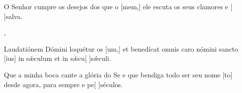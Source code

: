 {    {\item {}O Senhor cumpre os desejos dos que o [mem,] ele escuta os seus clamores e [ ]{sal}va.~\Responsorium},
  {\item {}Laudatiónem Dómini loquétur os [um,] et benedícat omnis caro nómini sancto [ius] in sǽculum et in sǽcu[ ]{sǽ}culi.~\Responsorium}%
    {\item {}Que a minha boca cante a glória do Se e que bendiga todo ser seu nome [to] desde agora, para sempre e pe[ ]{sé}culos.~\Responsorium}
}